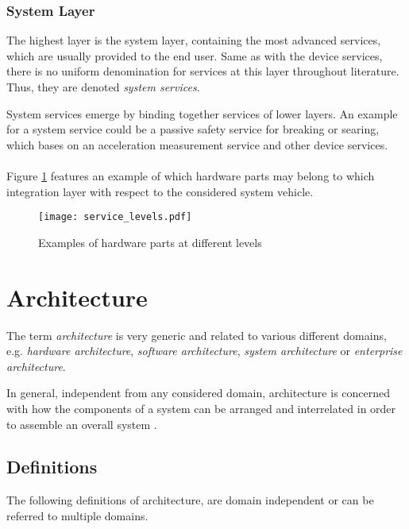 \subsubsection{System Layer}
The highest layer is the system layer, containing the most advanced services, which are usually provided to the end user. Same as with the device services, there is no uniform denomination for services at this layer throughout literature. Thus, they are denoted \emph{system services}.

System services emerge by binding together services of lower layers. An example for a system service could be a passive safety service for breaking or searing, which bases on an acceleration measurement service and other device services.
\\
\\
Figure \ref{fig:service_levels} features an example of which hardware parts may belong to which integration layer with respect to the considered system vehicle. 


\begin{figure}[!htbp]
\centering
\texttt{[image: service\_levels.pdf]}
\caption{Examples of hardware parts at different levels \cite{avl}}
\label{fig:service_levels}
\end{figure}









\section{Architecture}

\label{ch:architecture}

The term \emph{architecture} is very generic and related to various different domains, e.g. \emph{hardware architecture}, \emph{software architecture}, \emph{system architecture} or \emph{enterprise architecture}. 

In general, independent from any considered domain, architecture is concerned with how the components of a system can be arranged and interrelated in order to assemble an overall system \cite{ISO_42010} \cite{ning}. 



\subsection{Definitions}
The following definitions of architecture, are domain independent or can be referred to multiple domains.

